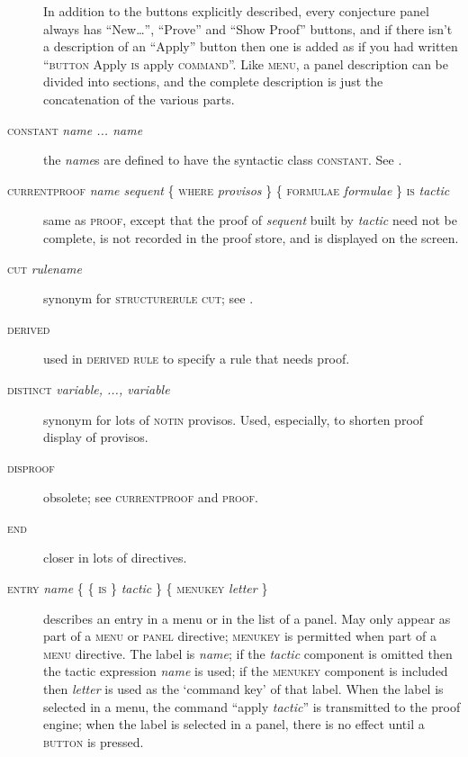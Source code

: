 \begin{description}
In addition to the buttons explicitly described, every conjecture panel always has ``New\dots'', ``Prove'' and ``Show Proof'' buttons, and if there isn't a description of an ``Apply'' button then one is added as if you had written ``\textsc{button} Apply \textsc{is} apply \textsc{command}''. Like \textsc{menu}, a panel description can be divided into sections, and the complete description is just the concatenation of the various parts.

\item[\textsc{constant} \textit{name ... name}] the \textit{name}s are defined to have the syntactic class \textsc{constant}. See .

\item[\textsc{currentproof} \textit{name sequent} \{ \textsc{where} \textit{provisos} \} \{ \textsc{formulae} \textit{formulae} \} \textsc{is} \textit{tactic}] same as \textsc{proof}, except that the proof of \textit{sequent} built by \textit{tactic} need not be complete, is not recorded in the proof store, and is displayed on the screen.

\item[\textsc{cut} \textit{rulename}] synonym for \textsc{structurerule} \textsc{cut}; see .

\item[\textsc{derived}] used in \textsc{derived rule} to specify a rule that needs proof.

\item[\textsc{distinct} \textit{variable, ..., variable}] synonym for lots of \textsc{notin} provisos. Used, especially, to shorten proof display of provisos.

\item[\textsc{disproof}] obsolete; see \textsc{currentproof} and \textsc{proof}.

\item[\textsc{end}] closer in lots of directives.

\item[\textsc{entry} \textit{name} \{ \{ \textsc{is} \} \textit{tactic} \} \{ \textsc{menukey} \textit{letter} \}] describes an entry in a menu or in the list of a panel. May only appear as part of a \textsc{menu} or \textsc{panel} directive; \textsc{menukey} is permitted when part of a \textsc{menu} directive. The label is \textit{name}; if the \textit{tactic} component is omitted then the tactic expression \textit{name} is used; if the \textsc{menukey} component is included then \textit{letter} is used as the `command key' of that label. When the label is selected in a menu, the command ``apply \textit{tactic}'' is transmitted to the proof engine; when the label is selected in a panel, there is no effect until a \textsc{button} is pressed.


\end{description}
